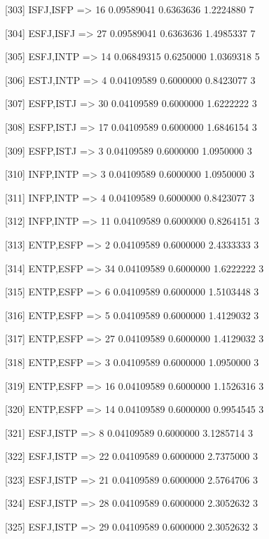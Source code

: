 [303] {ISFJ,ISFP}           => {16} 0.09589041 0.6363636  1.2224880  7   

[304] {ESFJ,ISFJ}           => {27} 0.09589041 0.6363636  1.4985337  7   

[305] {ESFJ,INTP}           => {14} 0.06849315 0.6250000  1.0369318  5   

[306] {ESTJ,INTP}           => {4}  0.04109589 0.6000000  0.8423077  3   

[307] {ESFP,ISTJ}           => {30} 0.04109589 0.6000000  1.6222222  3   

[308] {ESFP,ISTJ}           => {17} 0.04109589 0.6000000  1.6846154  3   

[309] {ESFP,ISTJ}           => {3}  0.04109589 0.6000000  1.0950000  3   

[310] {INFP,INTP}           => {3}  0.04109589 0.6000000  1.0950000  3   

[311] {INFP,INTP}           => {4}  0.04109589 0.6000000  0.8423077  3   

[312] {INFP,INTP}           => {11} 0.04109589 0.6000000  0.8264151  3   

[313] {ENTP,ESFP}           => {2}  0.04109589 0.6000000  2.4333333  3   

[314] {ENTP,ESFP}           => {34} 0.04109589 0.6000000  1.6222222  3   

[315] {ENTP,ESFP}           => {6}  0.04109589 0.6000000  1.5103448  3   

[316] {ENTP,ESFP}           => {5}  0.04109589 0.6000000  1.4129032  3   

[317] {ENTP,ESFP}           => {27} 0.04109589 0.6000000  1.4129032  3   

[318] {ENTP,ESFP}           => {3}  0.04109589 0.6000000  1.0950000  3   

[319] {ENTP,ESFP}           => {16} 0.04109589 0.6000000  1.1526316  3   

[320] {ENTP,ESFP}           => {14} 0.04109589 0.6000000  0.9954545  3   

[321] {ESFJ,ISTP}           => {8}  0.04109589 0.6000000  3.1285714  3   

[322] {ESFJ,ISTP}           => {22} 0.04109589 0.6000000  2.7375000  3   

[323] {ESFJ,ISTP}           => {21} 0.04109589 0.6000000  2.5764706  3   

[324] {ESFJ,ISTP}           => {28} 0.04109589 0.6000000  2.3052632  3   

[325] {ESFJ,ISTP}           => {29} 0.04109589 0.6000000  2.3052632  3   

